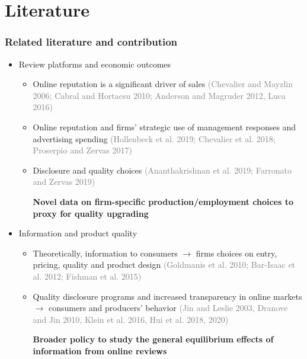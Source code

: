 \documentclass[aspectratio=169]{beamer}
\begin{document}
\section{Literature}

\begin{frame}
\frametitle{Related literature and contribution}

\begin{itemize}

\item<1-> Review platforms and economic outcomes
\begin{itemize}
\item Online reputation is a significant driver of sales \textcolor{gray}{\scriptsize (Chevalier and Mayzlin 2006; Cabral and Hortacsu 2010; Anderson and Magruder 2012, Luca 2016)}
\item  Online reputation and firms' strategic use of management responses and advertising spending \textcolor{gray}{\scriptsize (Hollenbeck et al. 2019; Chevalier et al.  2018; Proserpio and Zervas 2017)}
\item Disclosure and quality choices \textcolor{gray}{\scriptsize (Ananthakrishnan et al. 2019; Farronato and Zervas 2019)}
\vspace*{-1ex}
\begin{block}{\vspace{-3ex}}
\textbf{Novel data on firm-specific production/employment choices to proxy for quality upgrading}
\end{block}

\end{itemize}

\vspace{3mm}

\item<2> Information and product quality
\begin{itemize}

\item Theoretically,  information to consumers $\rightarrow$ firms choices on entry, pricing, quality and product design \textcolor{gray}{\scriptsize (Goldmanis et al. 2010; Bar-Isaac et al. 2012; Fishman et al. 2015)}

\item Quality disclosure programs and increased transparency in online markets $\rightarrow$ consumers and producers' behavior \textcolor{gray}{\scriptsize (Jin and Leslie 2003, Dranove and Jin 2010, Klein et al. 2016, Hui et al. 2018, 2020)}
\vspace*{-1ex}
\begin{block}{\vspace{-3ex}}
\textbf{Broader policy to study the general equilibrium effects of information from online reviews}
\end{block}
\end{itemize}

\end{itemize}
\end{frame}
\end{document}
